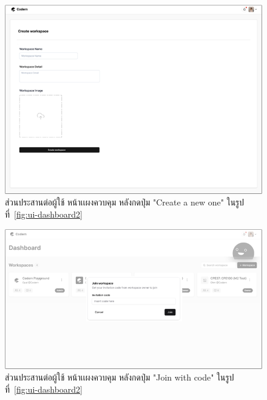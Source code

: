 \documentclass[12pt,oneside,openright,a4paper]{cpe-thai-project}
\begin{document}
    \hypertarget{ui-dashboard3}{
        \begin{figure}[H]
        \centering
            \includegraphics[width=15cm]{figure/ui/ui-dashboard3.png}
            \caption[ส่วนประสานต่อผู้ใช้ หน้าเเผงควบคุม (3)]{ส่วนประสานต่อผู้ใช้ หน้าเเผงควบคุม หลังกดปุ่ม "Create a new one" ในรูปที่~\ref{fig:ui-dashboard2}}
            \label{fig:ui-dashboard3}
        \end{figure}
    }
    
    \hypertarget{ui-dashboard4}{
        \begin{figure}[H]
        \centering
            \includegraphics[width=15cm]{figure/ui/ui-dashboard4.png}
            \caption[ส่วนประสานต่อผู้ใช้ หน้าเเผงควบคุม (4)]{ส่วนประสานต่อผู้ใช้ หน้าเเผงควบคุม หลังกดปุ่ม "Join with code" ในรูปที่~\ref{fig:ui-dashboard2}}
            \label{fig:ui-dashboard4}
        \end{figure}
    }
\end{document}

